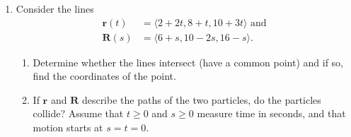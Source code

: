 \documentclass[%
]{article}
\newcommand{\vect}[1]{\mathbf{#1}}
\begin{document}
\begin{enumerate}
\item %
Consider the lines
\begin{align*}
\vect r(t) &= \langle 2+2t,8+t,10+3t\rangle \text{ and } \\
\vect R(s) &= \langle 6+s,10-2s,16-s\rangle.
\end{align*}
\begin{enumerate}
\item Determine whether the lines intersect (have a common point) and if so, find the coordinates of the point.
\item If $\vect r$ and $\vect R$ describe the paths of the two particles, do the particles collide?  Assume that $t\geq 0$ and $s\geq 0$ measure time in seconds, and that motion starts at $s=t=0$.
\end{enumerate}





\end{enumerate}
\end{document}

